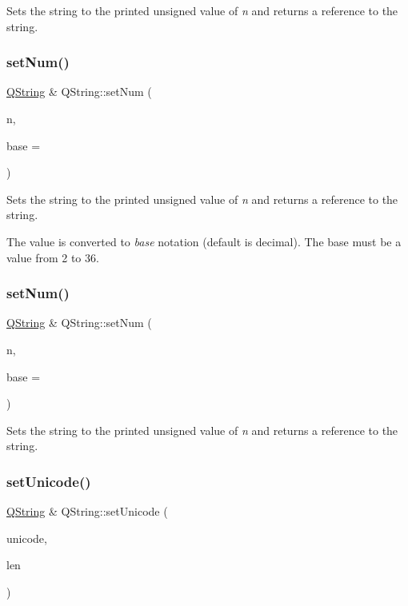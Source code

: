 Sets the string to the printed unsigned value of {\itshape n} and returns a reference to the string. \mbox{\label{class_q_string_af59c75f4897bf1f709a9ca83255ab2a0}} 
\subsubsection{\texorpdfstring{setNum()}{setNum()}\hspace{0.1cm}{\footnotesize\ttfamily [7/8]}}
{\footnotesize\ttfamily \mbox{\hyperlink{class_q_string}{Q\+String}} \& Q\+String\+::set\+Num (\begin{DoxyParamCaption}\item[{ulong}]{n,  }\item[{int}]{base = {} }\end{DoxyParamCaption})}

Sets the string to the printed unsigned value of {\itshape n} and returns a reference to the string.

The value is converted to {\itshape base} notation (default is decimal). The base must be a value from 2 to 36. \mbox{\label{class_q_string_a74b4eb9f51f1b59e2fedcb24bb52ceae}} 
\subsubsection{\texorpdfstring{setNum()}{setNum()}\hspace{0.1cm}{\footnotesize\ttfamily [8/8]}}
{\footnotesize\ttfamily \mbox{\hyperlink{class_q_string}{Q\+String}} \& Q\+String\+::set\+Num (\begin{DoxyParamCaption}\item[{ushort}]{n,  }\item[{int}]{base = {} }\end{DoxyParamCaption})\hspace{0.3cm}{\ttfamily [inline]}}

Sets the string to the printed unsigned value of {\itshape n} and returns a reference to the string. \mbox{\label{class_q_string_a220282acc5997df4e71e4e3a402bc8c4}} 
\subsubsection{\texorpdfstring{setUnicode()}{setUnicode()}}
{\footnotesize\ttfamily \mbox{\hyperlink{class_q_string}{Q\+String}} \& Q\+String\+::set\+Unicode (\begin{DoxyParamCaption}\item[{const \mbox{\hyperlink{class_q_char}{Q\+Char}} $\ast$}]{unicode,  }\item[{uint}]{len }\end{DoxyParamCaption})}

